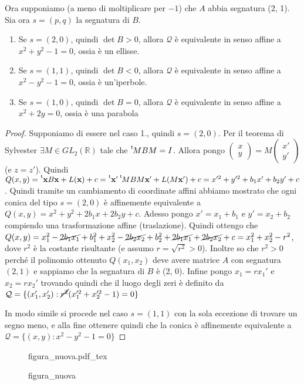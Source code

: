 \documentclass{article}
\newcommand*{\transp}[2][-3mu]{\ensuremath{\mskip1mu\prescript{\smash{\mathrm t\mkern#1}}{}{\mathstrut#2}}}%
\newcommand{\incfig}[2][1]{%
    \def\svgwidth{#1\columnwidth}
    {#2.pdf_tex}
}
\theoremstyle{plain}
\theoremstyle{definition}
\theoremstyle{remark}
\begin{document}
Ora supponiamo (a meno di moltiplicare per \(-1\)) che \(A\) abbia segnatura (2, 1). 
Sia ora \(s = (p, q)\) la segnatura di \(B\).
\begin{enumerate}[label = \arabic*.]
    \item Se \(s = (2, 0)\), quindi \(\det B > 0\),  allora \(\mathcal{Q}\) è equivalente in senso
        affine a \(x^2 + y^2 - 1 = 0\), ossia è un ellisse.
    \item Se \(s = (1, 1)\), quindi \(\det B < 0\), allora \(\mathcal{Q}\) è equivalente in senso affine
        a \(x^2 - y^2 - 1 = 0\), ossia è un'iperbole.
    \item Se \(s = (1, 0)\), quindi \(\det B = 0\), allora \(\mathcal{Q}\) è
        equivalente in senso affine a \(x^2 + 2y = 0\), ossia è una parabola
\end{enumerate}
\begin{proof}
    Supponiamo di essere nel caso 1., quindi \(s = (2, 0)\). Per il teorema
    di Sylvester \(\exists M \in GL_{2}(\mathbb{R})\) tale che \(\transp{M} B M =
    I\). Allora pongo \(\begin{pmatrix}
        x \\
        y
    \end{pmatrix} = M \begin{pmatrix}
        x' \\
        y' 
    \end{pmatrix}\) (e \(z = z'\)). Quindi \(Q(x, y) = \transp[-1mu]{\mathbf{x}} B
    \mathbf{x} + L(\mathbf{x}) + c = \transp[-1mu]{\mathbf{x}}' \transp{M} B M \mathbf{x}' +
    L(M \mathbf{x'}) + c = x'^2 + y'^2 + b_{1} x' + b_{2} y' + c\). Quindi
    tramite un cambiamento di coordinate affini abbiamo mostrato che ogni conica
    del tipo \(s = (2, 0)\) è affinemente equivalente a \(Q(x, y) = x^2 + y^2 +
    2b_{1}x + 2 b_{2}y + c\). Adesso pongo \(x' = x_{1} + b_{1}\) e \(y'= x_{2} +
    b_{2}\) compiendo una trasformazione affine (traslazione). Quindi ottengo
    che \(Q(x, y) = x_{1}^2 - \cancel{2b_{1}x_{1}} + b_{1}^2 + x_{2}^2 - \cancel{2b_{2}x_{2}} +
    b_{2}^2 + \cancel{2b_{1}x_{1}} + \cancel{2b_{2}x_{2}} + c = x_{1}^2 +
    x_{2}^2 - r^2 \), dove \(r^2\) è la costante risultante (e assumo \(r =
    \sqrt{r^2} > 0\)). Inoltre so che
    \(r^2 > 0\) perché il polinomio ottenuto \(Q(x_{1}, x_{2})\) deve avere
    matrice \(A\) con segnatura \((2, 1)\) e sappiamo che la segnatura di \(B\)
    è (2, 0). Infine pongo \(x_{1} = r x_{1}'\) e \(x_{2} = r x_{2}'\) trovando
    quindi che il luogo degli zeri è definito da \(\mathcal{Q} = \{(x_{1}',
    x_{2}') : \cancel{r^2}(x_{1}'^2 + x_{2}'^2 - 1) = 0\}\) 

    In modo simile si procede nel caso \(s = (1, 1)\) con la sola eccezione di
    trovare un segno meno, e alla fine ottenere quindi che la conica è
    affinemente equivalente a \(\mathcal{Q} = \{(x, y) : x^2 - y^2 - 1 = 0\} \) 
\end{proof}
\begin{figure}[ht]
    \centering
    \incfig{figura_nuova}
    \caption{figura_nuova}
    \label{fig:figura_nuova}
\end{figure}
\end{document}
